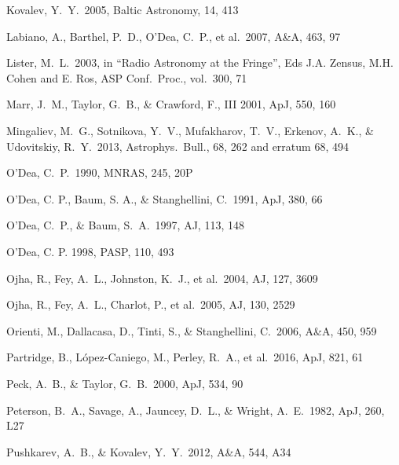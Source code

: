 \documentclass{pasa}%
\begin{document}
\begin{thebibliography}{}
Kovalev, Y.~Y.\ 2005, Baltic Astronomy, 14, 413

Labiano, A., Barthel, P.~D., O'Dea, C.~P., et al.\ 2007, A\&A, 463, 97 

Lister, M.~L.\ 2003, in ``Radio Astronomy at the Fringe'',
Eds J.A. Zensus, M.H. Cohen and E. Ros, 
ASP Conf.\ Proc., vol.\ 300,  71 

Marr, J.~M., Taylor, G.~B., \& Crawford, F., III 2001, ApJ, 550, 160 

Mingaliev, M.~G., Sotnikova, Y.~V., Mufakharov, T.~V., Erkenov, A.~K., 
\& Udovitskiy, R.~Y.\ 2013, Astrophys.\ Bull., 68, 262 and erratum 68, 494

O'Dea, C.~P.\ 1990, MNRAS, 245, 20P 

O'Dea,  C. P., Baum, S. A., \& Stanghellini, C.\ 1991, ApJ, 380, 66 

O'Dea, C.~P., \& Baum, S.~A.\ 1997, AJ, 113, 148 

O'Dea, C. P. 1998, PASP, 110, 493

Ojha, R., Fey, A.~L., Johnston, K.~J., et al.\ 2004, AJ, 127, 3609 

Ojha, R., Fey, A.~L., Charlot, P., et al.\ 2005, AJ, 130, 2529 

Orienti, M., Dallacasa, D., Tinti, S., \& Stanghellini, C.\ 2006, A\&A, 450, 959 

Partridge, B., L{\'o}pez-Caniego, M., Perley, R.~A., et al.\ 2016, ApJ, 821, 61

Peck, A.~B., \& Taylor, G.~B.\ 2000, ApJ, 534, 90 

Peterson, B.~A., Savage, A., Jauncey, D.~L., \& Wright, A.~E.\ 1982, ApJ, 260, L27 

Pushkarev, A.~B., \& Kovalev, Y.~Y.\ 2012, A\&A, 544, A34 


\end{thebibliography}
\end{document}

